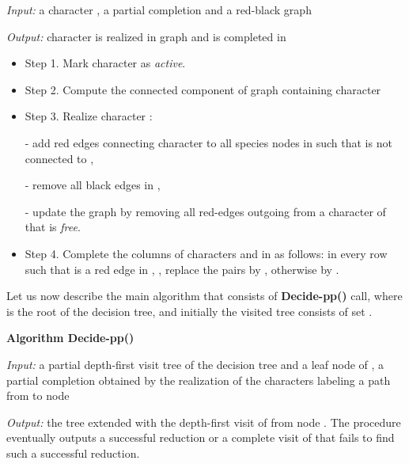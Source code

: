 \documentclass{llncs}
\newcommand{\pp}{Decide-pp}
\newcommand{\grb}{ }
\newcommand{\grbc}{, }
\begin{document}
 {\em Input:} a  character , a partial completion  and a red-black graph \grb  

 {\em Output:} character  is realized in graph \grb and  is completed in  

\begin{itemize}

\item Step 1.  Mark character  as {\em active}.
\item Step 2.  Compute the connected component  of graph \grb containing character 
\item Step 3.  Realize character :

- add red edges connecting character  to all  species nodes   in  such that  is not connected to ,

	- remove all black edges  in ,
	
	- update the graph \grb by removing all red-edges outgoing  from a character  of \grb that is {\em free}.
 
	
\item Step 4.  Complete the  columns of characters  and  in    as follows:   in every row  such that  is a red edge in \grbc,  replace   the  pairs  by ,  otherwise     by .





\end{itemize}







Let us now describe the main algorithm that consists of 
 {\bf \pp ()} call, where  is the root of the decision tree,  and initially the visited tree consists of set .


 








{\bf Algorithm \pp()}

 {\em Input:}  a partial depth-first visit tree  of the decision tree  and a leaf  node  of ,  a partial completion   obtained by the realization of  the  characters labeling a path  from  to node 

 {\em Output:} the tree  extended with the depth-first visit of   from  node .
The procedure eventually outputs a successful reduction or a complete visit of  that fails to find such a successful reduction.
\end{document}
